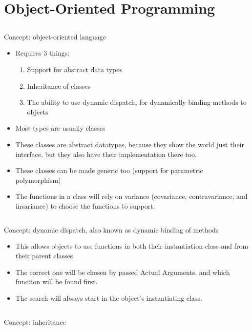 \section{Object-Oriented Programming}\label{sec:OOP}

\subsection{}
Concept: object-oriented language

\begin{itemize}[noitemsep]
\item Requires 3 things:
  \begin{enumerate}[noitemsep]
  \item Support for abstract data types
  \item Inheritance of classes
  \item The ability to use dynamic dispatch, for dynamically binding methods to objects
  \end{enumerate}
\item Most types are usually classes
\item These classes are abstract datatypes, because they show the world just their interface, but they also have their implementation there too.
\item These classes can be made generic too (support for parametric polymorphism)
\item The functions in a class will rely on variance (covariance, contravariance, and invariance) to choose the functions to support.
\end{itemize}

\subsection{}
Concept: dynamic dispatch, also known as dynamic binding of methods

\begin{itemize}[noitemsep]
\item This allows objects to use functions in both their instantiation class and from their parent classes.
\item The correct one will be chosen by passed Actual Arguments, and which function will be found first.
\item The search will always start in the object's instantiating class.
\end{itemize}

\subsection{}
Concept: inheritance

